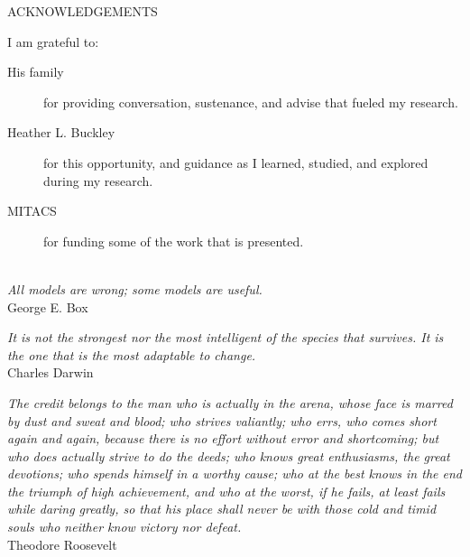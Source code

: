 \newpage
{}

\begin{center}
    ACKNOWLEDGEMENTS
\end{center}

\noindent I am grateful to:
\begin{description}
    \item[His family]
    	for providing conversation, sustenance, and advise that fueled my research.
    \item[Heather L. Buckley]
    	for this opportunity, and guidance as I learned, studied, and explored during my research.
    \item[MITACS]
    	for funding some of the work that is presented.
\end{description}

\begin{flushright} 
\textit{
    \\ All models are wrong; some models are useful.
} \\
George E. Box \\
\end{flushright}


\begin{flushright}
\textit{
    It is not the strongest nor the most intelligent of the species that survives.
    It is the one that is the most adaptable to change.
} \\
Charles Darwin \\
\end{flushright}

\begin{flushright}
\textit{
    The credit belongs to the man who is actually in the arena, whose face is marred by dust and sweat and blood; who strives valiantly; who errs, who comes short again and again, because there is no effort without error and shortcoming; but who does actually strive to do the deeds; who knows great enthusiasms, the great devotions; who spends himself in a worthy cause; who at the best knows in the end the triumph of high achievement, and who at the worst, if he fails, at least fails while daring greatly, so that his place shall never be with those cold and timid souls who neither know victory nor defeat.
} \\
Theodore Roosevelt \\
\end{flushright}



